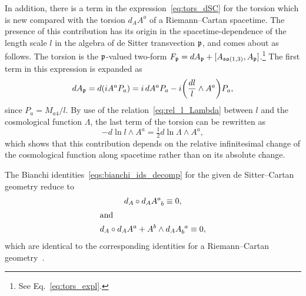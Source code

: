 \documentclass[
final,
11pt,
a4paper,
DIV=11,
headinclude=true,
footinclude=false,
bibliography=totoc,
twoside=true,  %
BCOR=5mm
]{scrbook}
\begin{document}
In addition, there is a term in the 
expression~\eqref{eq:tors_dSC} for the torsion which is new 
compared with the torsion $d_A A^a$ of a Riemann--Cartan 
spacetime. The presence of this contribution has its origin in 
the spacetime-dependence of the length scale $l$ in the algebra 
of de Sitter transvection $\mathfrak{p}$, and comes about as follows.  
The torsion is the $\mathfrak{p}$-valued two-form $F_\mathfrak{p} = dA_\mathfrak{p} 
+ [A_{\mathfrak{so}(1,3)}, A_\mathfrak{p}]$.\footnote{%
  See Eq.~\eqref{eq:tors_expl}.} The first term in this 
expression is expanded as
\begin{displaymath}
  dA_\mathfrak{p} = d(i A^a P_a) 
  = i\, dA^a P_a - i \bigg(\frac{dl}{l} \wedge A^a \bigg) P_a,
\end{displaymath}
since $P_a = M_{a4}/l$. By use of the 
relation~\eqref{eq:rel_l_Lambda} between $l$ and the cosmological 
function $\Lambda$, the last term of the torsion can be rewritten 
as
\begin{displaymath}
	- d\ln l \wedge A^a = \tfrac{1}{2} d\ln\Lambda \wedge A^a,
\end{displaymath}
which shows that this contribution depends on the relative 
infinitesimal change of the cosmological function along spacetime 
rather than on its absolute change. 

The Bianchi identities~\eqref{eqs:bianchi_ids_decomp} for the 
given de Sitter--Cartan geometry reduce to
\begin{subequations}
\label{eqs:lin_Bianchi}
\begin{gather}
  \label{eq:lin_Bianchi1}
  d_A \circ d_A A\ind{^a_b}
  \equiv 0,
  \\
\shortintertext{and}
  \label{eq:lin_Bianchi2}
  d_A \circ d_A A^a + A^b \wedge d_A A\ind{_b^a} \equiv 0,
\end{gather}
\end{subequations}
which are identical to the corresponding identities for 
a Riemann--Cartan geometry~\cite{Trautman:2006ec}.
\end{document}
